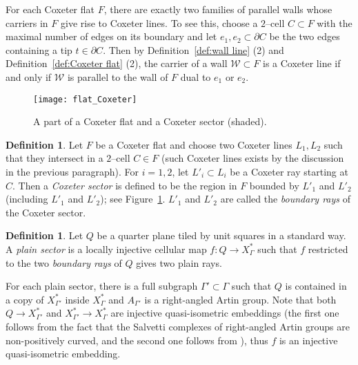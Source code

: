 \documentclass[11pt]{amsart}
\newcommand {\W}{\mathcal W}
\theoremstyle{definition}
\newtheorem{definition}[theorem]{Definition}
\newcommand{\Xa}{X^{\ast}}
\begin{document}
For each Coxeter flat $F$, there are exactly two families of parallel walls whose carriers in $F$ give rise to Coxeter lines. To see this, choose a $2$--cell $C\subset F$ with the maximal number of edges on its boundary and let $e_1,e_2\subset \partial C$ be the two edges containing a tip $t\in \partial C$. Then by 
Definition~\ref{def:wall line} (2) and Definition~\ref{def:Coxeter flat} (2), the carrier of a wall $\W\subset F$ is a Coxeter line if and only if $\W$ is parallel to the wall of $F$ dual to $e_1$ or $e_2$.

\begin{figure}[h!]
	\centering
	\texttt{[image: flat\_Coxeter]}
	\caption{A part of a Coxeter flat and a Coxeter sector (shaded).}
	\label{f:flat_Coxeter}
\end{figure}

\begin{definition}
Let $F$ be a Coxeter flat and choose two Coxeter lines $L_1,L_2$ such that they intersect in a $2$--cell $C\in F$ (such Coxeter lines exists by the discussion in the previous paragraph). For $i=1,2$, let $L'_i\subset L_i$ be a Coxeter ray starting at $C$. Then a \emph{Coxeter sector} is defined to be the region in $F$ bounded by $L'_1$ and $L'_2$ (including $L'_1$ and $L'_2$); see Figure~\ref{f:flat_Coxeter}. $L'_1$ and $L'_2$ are called the \emph{boundary rays} of the Coxeter sector.
\end{definition}

\begin{definition}
	\label{def:plain sector}
Let $Q$ be a quarter plane tiled by unit squares in a standard way. A \emph{plain sector} is a locally injective cellular map $f\colon Q\to \Xa_\Gamma$ such that $f$ restricted to the two \emph{boundary rays} of $Q$ gives two plain rays.
\end{definition}

For each plain sector, there is a full subgraph $\Gamma'\subset\Gamma$ such that $Q$ is contained in a copy of $\Xa_{\Gamma'}$ inside $\Xa_\Gamma$ and $A_{\Gamma'}$ is a right-angled Artin group. Note that both $Q\to \Xa_{\Gamma'}$ and $\Xa_{\Gamma'}\to \Xa_\Gamma$ are injective quasi-isometric embeddings (the first one follows from the fact that the Salvetti complexes of right-angled Artin groups are non-positively curved, and the second one follows from \cite[Theorem 1.2]{charney2014convexity}), thus $f$ is an injective quasi-isometric embedding.
\end{document}
